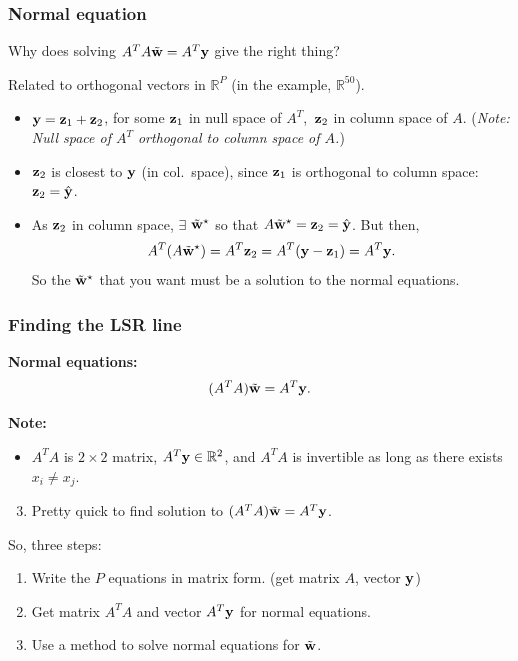 \documentclass{beamer}
\theoremstyle{example}
\begin{document}
\begin{frame}
\frametitle{Normal equation}
Why does solving $A^TA\tilde{\bf w} = A^T{\bf y}$ give the right thing?
\vspace*{12pt}

\pause
Related to orthogonal vectors in $\mathbb R^P$ (in the example, $\mathbb R^{50}$).

\begin{itemize}
    \item ${\bf y} = {\bf z}_1 + {\bf z}_2$, for some ${\bf z}_1$ in null space of $A^T$,\ ${\bf z}_2$ in column space of $A$.\newline 
    \qquad (\emph{Note: Null space of $A^T$ orthogonal to column space of $A$.})
    \pause
    \item ${\bf z}_2$ is closest to ${\bf y}$ (in col.~space), since ${\bf z}_1$ is orthogonal to column space: ${\bf z}_2 = \hat{\bf y}$. 
    \pause
    \item As ${\bf z}_2$ in column space, $\exists$ $\tilde{\bf w}^\star$ so that $A\tilde{\bf w}^\star = {\bf z}_2 = \hat{\bf y}$.\pause \hspace*{0.5em}
    But then, 
    \[A^T(A\tilde{\bf w}^\star) = A^T{\bf z}_2 = A^T({\bf y} - {\bf z}_1) = A^T{\bf y}.\]
    So the $\tilde{\bf w}^\star$ that you want must be a solution to the normal equations.
\end{itemize}

\end{frame}

\begin{frame}
\frametitle{Finding the LSR line}
\textbf{Normal equations:} 
\[(A^TA)\tilde{\bf w} = A^T{\bf y}.\]

\pause
\textbf{Note:}
\begin{itemize}
    \item $A^TA$ is $2\times 2$ matrix, $A^T{\bf y}\in\mathbb R^2$, and $A^TA$ is invertible as long as there exists $x_i\ne x_j$.
\end{itemize}

\pause 
\begin{enumerate}
\setcounter{enumi}{2}
    \item Pretty quick to find solution to $(A^TA)\tilde{\bf w} = A^T{\bf y}$.
\end{enumerate}

\pause 
So, three steps: 
\begin{enumerate}
    \item Write the $P$ equations in matrix form. (get matrix $A$, vector ${\bf y}$)
    \item Get matrix $A^TA$ and vector $A^T{\bf y}$ for normal equations.
    \item Use a method to solve normal equations for $\tilde{\bf w}$.
\end{enumerate}
\end{frame}
\end{document}
